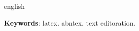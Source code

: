 \begin{resumo}[Abstract]
 \begin{otherlanguage*}{english}
   \lipsum[1-2]
 
   \noindent 
   \textbf{Keywords}: latex. abntex. text editoration.
 \end{otherlanguage*}
\end{resumo}
%
%